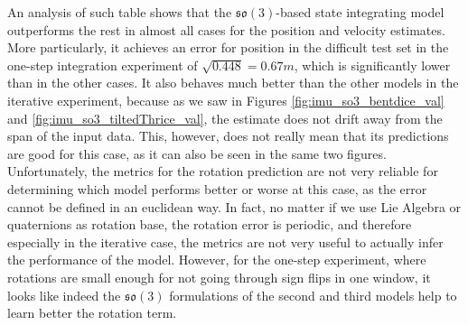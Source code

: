 An analysis of such table shows that the $\mathfrak{so}(3)$-based state integrating model outperforms the rest in almost all cases for the position and velocity estimates.
More particularly, it achieves an error for position in the difficult test set in the one-step integration experiment of $\sqrt{0.448}=0.67m$, which is significantly lower than in the other cases.
It also behaves much better than the other models in the iterative experiment, because as we saw in Figures \ref{fig:imu_so3_bentdice_val} and \ref{fig:imu_so3_tiltedThrice_val}, the estimate does not drift away from the span of the input data.
This, however, does not really mean that its predictions are good for this case, as it can also be seen in the same two figures.
Unfortunately, the metrics for the rotation prediction are not very reliable for determining which model performs better or worse at this case, as the error cannot be defined in an euclidean way.
In fact, no matter if we use Lie Algebra or quaternions as rotation base, the rotation error is periodic, and therefore especially in the iterative case, the metrics are not very useful to actually infer the performance of the model.
However, for the one-step experiment, where rotations are small enough for not going through sign flips in one window, it looks like indeed the $\mathfrak{so}(3)$ formulations of the second and third models help to learn better the rotation term.

